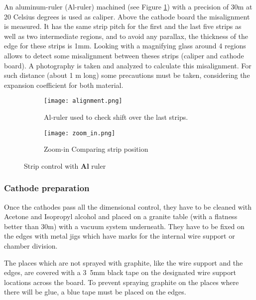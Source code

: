 An aluminum-ruler (Al-ruler) machined (see Figure \ref{fig:ruler}) with a precision of 30\micro m at 20 Celsius degrees is used as
caliper.  Above the cathode board the misalignment is measured. It has the same strip pitch for the first and the last five
strips as well as two intermediate regions, and to avoid any parallax, the thickness of the edge for these strips is 1mm.
Looking with a magnifying glass around 4 regions allows to detect some misalignment between theses strips (caliper
and cathode board). A photography is taken and analyzed to calculate this misalignment. For such distance (about 1 m
long) some precautions must be taken, considering the expansion coefficient for both material.\par
\vspace{1cm}
\begin{figure}[ht]
	\centering
	\hspace*{\fill}
	{\begin{subfigure}[b]{0.35\textwidth}
		\texttt{[image: alignment.png]}
		\caption{Al-ruler used to check shift over the last strips.}
		\label{fig:ruler}
	\end{subfigure}
	}
	\hfill
	{\begin{subfigure}[b]{0.35\textwidth}
		\texttt{[image: zoom\_in.png]}
		\caption{Zoom-in Comparing strip position}
		\label{fig:zoom}
	\end{subfigure}
	}
	\hspace*{\fill}
	\caption{Strip control with {\bf Al} ruler}
\end{figure}

\subsubsection{Cathode preparation}

Once the cathodes pass all the dimensional control, they have to be cleaned with Acetone and Isopropyl alcohol and placed on a
granite table (with a flatness  better than 30\micro m) with a vacuum system underneath. They have to be fixed on the edges with
metal jigs which have marks for the internal wire support or chamber division.\par
The places which are not sprayed with graphite, like the wire support and the edges, are covered with a \unit{3.5}{mm}
black tape on the designated wire support locations across the board. To prevent spraying graphite on the places where
there will be glue, a blue tape must be placed on the edges.

